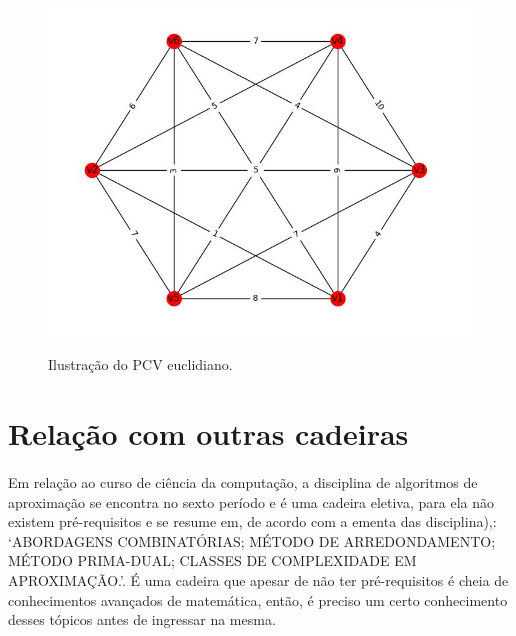 \documentclass[a4paper,10pt]{article}
\begin{document}
\begin{figure}
\centering
    \includegraphics[width=130mm]{caixeiro.jpg}
    \caption{Ilustração do PCV euclidiano.}
    \cite{img}
\end{figure}
\paragraph{}

\section{Relação com outras cadeiras}

\paragraph{}
Em relação ao curso de ciência da computação, a disciplina de algoritmos de aproximação se encontra no sexto período e é uma cadeira eletiva, para ela não existem pré-requisitos e se resume em, de acordo com a ementa das disciplina),: ‘ABORDAGENS COMBINATÓRIAS; MÉTODO DE ARREDONDAMENTO; MÉTODO PRIMA-DUAL; CLASSES DE COMPLEXIDADE EM APROXIMAÇÃO.’. É uma cadeira que apesar de não ter pré-requisitos é cheia de conhecimentos avançados de matemática, então, é preciso um certo conhecimento desses tópicos antes de ingressar na mesma.



\end{document}
